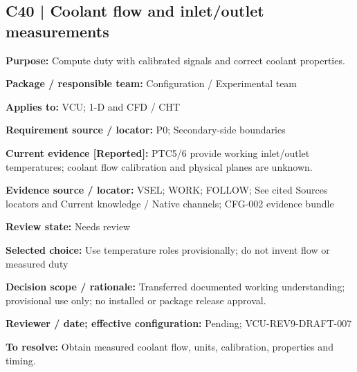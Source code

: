 \documentclass[11pt]{article}
\begin{document}
\par\noindent\begin{minipage}{\textwidth}\small\setlength{\parskip}{2pt}
\subsection*{C40 | Coolant flow and inlet/outlet measurements}
\textbf{Purpose:} Compute duty with calibrated signals and correct coolant properties.\par
\textbf{Package / responsible team:} Configuration / Experimental team\par
\textbf{Applies to:} VCU; 1-D and CFD / CHT\par
\textbf{Requirement source / locator:} P0; Secondary-side boundaries\par
\textbf{Current evidence [Reported]:} PTC5/6 provide working inlet/outlet temperatures; coolant flow calibration and physical planes are unknown.\par
\textbf{Evidence source / locator:} VSEL; WORK; FOLLOW; See cited Sources locators and Current knowledge / Native channels; CFG-002 evidence bundle\par
\textbf{Review state:} Needs review\par
\textbf{Selected choice:} Use temperature roles provisionally; do not invent flow or measured duty\par
\textbf{Decision scope / rationale:} Transferred documented working understanding; provisional use only; no installed or package release approval.\par
\textbf{Reviewer / date; effective configuration:} Pending; VCU-REV9-DRAFT-007\par
\textbf{To resolve:} Obtain measured coolant flow, units, calibration, properties and timing.\par
\end{minipage}\par\vspace{5pt}
\end{document}

